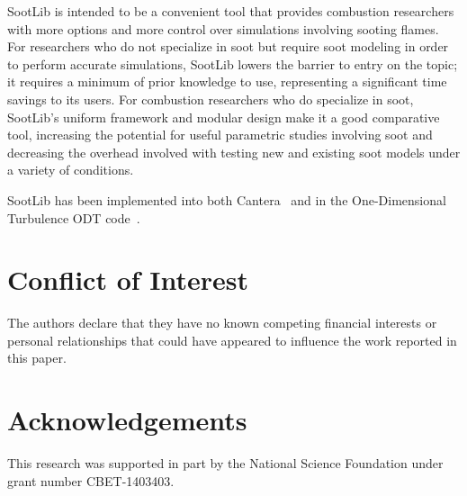 \documentclass[preprint,letterpaper]{elsarticle}
\begin{document}
SootLib is intended to be a convenient tool that provides combustion researchers with more options and more control over simulations involving sooting flames. For researchers who do not specialize in soot but require soot modeling in order to perform accurate simulations, SootLib lowers the barrier to entry on the topic; it requires a minimum of prior knowledge to use, representing a significant time savings to its users. For combustion researchers who do specialize in soot, SootLib's uniform framework and modular design make it a good comparative tool, increasing the potential for useful parametric studies involving soot and decreasing the overhead involved with testing new and existing soot models under a variety of conditions.

SootLib has been implemented into both Cantera~\cite{Cantera} and in the One-Dimensional Turbulence ODT code~\cite{Stephens_2021}. 


\section{Conflict of Interest}

The authors declare that they have no known competing financial interests or personal relationships that could have appeared to influence the work reported in this paper.


\section*{Acknowledgements}

This research was supported in part by the National Science Foundation under grant number CBET-1403403.


\end{document}
